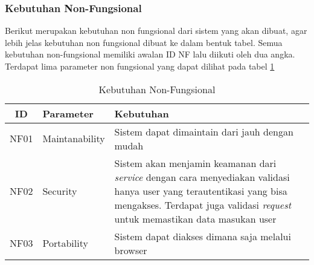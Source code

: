 \subsubsection{Kebutuhan Non-Fungsional}
Berikut merupakan kebutuhan non fungsional dari sistem yang akan dibuat, agar lebih jelas kebutuhan non fungsional dibuat ke dalam bentuk tabel. Semua kebutuhan non-fungsional memiliki awalan ID NF lalu diikuti oleh dua angka. Terdapat lima parameter non fungsional yang dapat dilihat pada tabel \ref{tab:kebutuhan-non-fungsional}

\bgroup
\begin{table}[ht]
  \def\arraystretch{1.7}
  \caption{Kebutuhan Non-Fungsional}
  \label{tab:kebutuhan-non-fungsional}
  \centering
  \begin{tabular}{|c|p{3cm}|p{8cm}|}
    \hline
    ID   & Parameter      & Kebutuhan                                                                                       \\
    \hline
    NF01 & Maintanability & Sistem dapat dimaintain dari jauh dengan mudah                                                  \\
    \hline
    NF02 & Security       & Sistem akan menjamin keamanan dari \textit{service} dengan cara menyediakan validasi hanya user yang terautentikasi yang bisa mengakses. Terdapat juga validasi \textit{request} untuk memastikan data masukan user \\
    \hline
    NF03 & Portability    & Sistem dapat diakses dimana saja melalui browser                                                \\
    \hline
  \end{tabular}
\end{table}
\egroup
